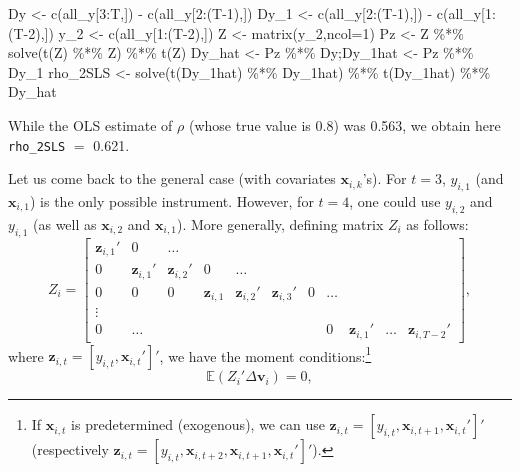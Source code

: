 \documentclass[
  12pt,
]{book}
\newenvironment{Shaded}{\begin{snugshade}}{\end{snugshade}}
\newcommand{\AttributeTok}[1]{\textcolor[rgb]{0.77,0.63,0.00}{#1}}
\newcommand{\DecValTok}[1]{\textcolor[rgb]{0.00,0.00,0.81}{#1}}
\newcommand{\FunctionTok}[1]{\textcolor[rgb]{0.00,0.00,0.00}{#1}}
\newcommand{\NormalTok}[1]{#1}
\newcommand{\OtherTok}[1]{\textcolor[rgb]{0.56,0.35,0.01}{#1}}
\newcommand{\SpecialCharTok}[1]{\textcolor[rgb]{0.00,0.00,0.00}{#1}}
\theoremstyle{definition}
\theoremstyle{definition}
\theoremstyle{definition}
\theoremstyle{definition}
\theoremstyle{remark}
\begin{document}
\begin{Shaded}
\begin{Highlighting}[]
\NormalTok{Dy   }\OtherTok{\textless{}{-}} \FunctionTok{c}\NormalTok{(all\_y[}\DecValTok{3}\SpecialCharTok{:}\NormalTok{T,]) }\SpecialCharTok{{-}} \FunctionTok{c}\NormalTok{(all\_y[}\DecValTok{2}\SpecialCharTok{:}\NormalTok{(T}\DecValTok{{-}1}\NormalTok{),])}
\NormalTok{Dy\_1 }\OtherTok{\textless{}{-}} \FunctionTok{c}\NormalTok{(all\_y[}\DecValTok{2}\SpecialCharTok{:}\NormalTok{(T}\DecValTok{{-}1}\NormalTok{),]) }\SpecialCharTok{{-}} \FunctionTok{c}\NormalTok{(all\_y[}\DecValTok{1}\SpecialCharTok{:}\NormalTok{(T}\DecValTok{{-}2}\NormalTok{),])}
\NormalTok{y\_2  }\OtherTok{\textless{}{-}} \FunctionTok{c}\NormalTok{(all\_y[}\DecValTok{1}\SpecialCharTok{:}\NormalTok{(T}\DecValTok{{-}2}\NormalTok{),])}
\NormalTok{Z }\OtherTok{\textless{}{-}} \FunctionTok{matrix}\NormalTok{(y\_2,}\AttributeTok{ncol=}\DecValTok{1}\NormalTok{)}
\NormalTok{Pz }\OtherTok{\textless{}{-}}\NormalTok{ Z }\SpecialCharTok{\%*\%} \FunctionTok{solve}\NormalTok{(}\FunctionTok{t}\NormalTok{(Z) }\SpecialCharTok{\%*\%}\NormalTok{ Z) }\SpecialCharTok{\%*\%} \FunctionTok{t}\NormalTok{(Z)}
\NormalTok{Dy\_hat  }\OtherTok{\textless{}{-}}\NormalTok{ Pz }\SpecialCharTok{\%*\%}\NormalTok{ Dy;Dy\_1hat }\OtherTok{\textless{}{-}}\NormalTok{ Pz }\SpecialCharTok{\%*\%}\NormalTok{ Dy\_1}
\NormalTok{rho\_2SLS }\OtherTok{\textless{}{-}} \FunctionTok{solve}\NormalTok{(}\FunctionTok{t}\NormalTok{(Dy\_1hat) }\SpecialCharTok{\%*\%}\NormalTok{ Dy\_1hat) }\SpecialCharTok{\%*\%} \FunctionTok{t}\NormalTok{(Dy\_1hat) }\SpecialCharTok{\%*\%}\NormalTok{ Dy\_hat}
\end{Highlighting}
\end{Shaded}

While the OLS estimate of \(\rho\) (whose true value is 0.8) was 0.563, we obtain here \texttt{rho\_2SLS} \(=\) 0.621.

Let us come back to the general case (with covariates \(\mathbf{x}_{i,k}\)'s). For \(t=3\), \(y_{i,1}\) (and \(\mathbf{x}_{i,1}\)) is the only possible instrument. However, for \(t=4\), one could use \(y_{i,2}\) and \(y_{i,1}\) (as well as \(\mathbf{x}_{i,2}\) and \(\mathbf{x}_{i,1}\)). More generally, defining matrix \(Z_i\) as follows:
\[
Z_i = \left[
\begin{array}{ccccccccccccccccc}
\mathbf{z}_{i,1}' & 0 & \dots \\
0 & \mathbf{z}_{i,1}' & \mathbf{z}_{i,2}' & 0 & \dots \\
0 &0 &0 & \mathbf{z}_{i,1} & \mathbf{z}_{i,2}' & \mathbf{z}_{i,3}' & 0 & \dots \\
\vdots \\
0 & \dots &&&&&& 0 & \mathbf{z}_{i,1}' &  \dots &   \mathbf{z}_{i,T-2}'
\end{array}
\right],
\]
where \(\mathbf{z}_{i,t} = [y_{i,t},\mathbf{x}_{i,t}']'\), we have the moment conditions:\footnote{If \(\mathbf{x}_{i,t}\) is predetermined (exogenous), we can use \(\mathbf{z}_{i,t} = [y_{i,t},\mathbf{x}_{i,t+1},\mathbf{x}_{i,t}']'\) (respectively \(\mathbf{z}_{i,t} = [y_{i,t},\mathbf{x}_{i,t+2},\mathbf{x}_{i,t+1},\mathbf{x}_{i,t}']'\)).}
\[
\mathbb{E}(Z_i'\Delta  \mathbf{v}_i)=0,
\]
\end{document}

